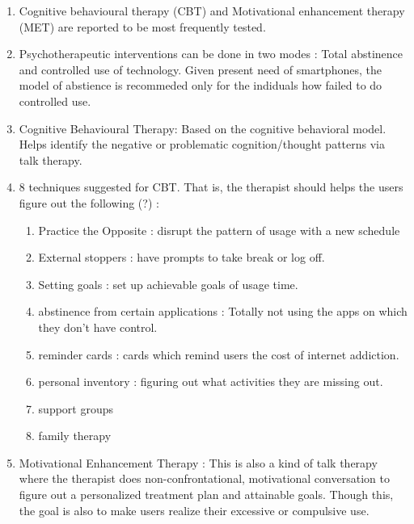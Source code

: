 \documentclass{article}
\begin{document}
\begin{enumerate}
\begin{enumerate}
\begin{itemize}
        \end{itemize}
        \item Community based treatment
        \begin{itemize}
            \item assertive community treatment
            \item first episode psychosis intervention
        \end{itemize}
        \item Vocational Rehabilitation
        \item Peer support services
        \item Integrated care intervention
    \end{enumerate}
    \item Cognitive behavioural therapy (CBT) and Motivational enhancement therapy (MET) are reported to be most frequently tested.
    \item Psychotherapeutic interventions can be done in two modes : Total abstinence and controlled use of technology. Given present need of smartphones, the model of abstience is recommeded only for the indiduals how failed to do controlled use. 
    \item Cognitive Behavioural Therapy: Based on the cognitive behavioral model. Helps identify the negative or problematic cognition/thought patterns via talk therapy.
    \item 8 techniques suggested for CBT. That is, the therapist should helps the users figure out the following (?) : 
    \begin{enumerate}
        \item Practice the Opposite : disrupt the pattern of usage with a new schedule
        \item External stoppers : have prompts to take break or log off.
        \item Setting goals : set up achievable goals of usage time.
        \item abstinence from certain applications  : Totally not using the apps on which they don't have control.
        \item reminder cards : cards which remind users the cost of internet addiction.
        \item personal inventory : figuring out what activities they are missing out.
        \item support groups 
        \item family therapy
    \end{enumerate}
    \item Motivational Enhancement Therapy : This is also a kind of talk therapy where the therapist does non-confrontational, motivational conversation to figure out a personalized treatment plan and attainable goals. 
    Though this, the goal is also to make users realize their excessive or compulsive use.
\end{enumerate}
\end{document}
